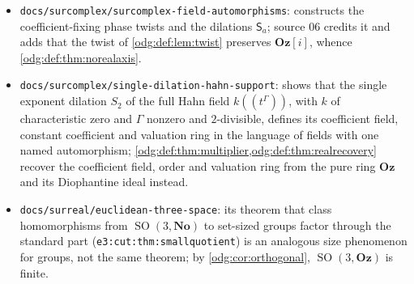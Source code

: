 \documentclass[11pt,oneside]{article}
\numberwithin{equation}{section}
\theoremstyle{definition}
\theoremstyle{remark}
\newcommand{\No}{\mathbf{No}}
\newcommand{\Oz}{\mathbf{Oz}}
\newcommand{\Z}{\mathbb Z}
\newcommand{\GL}{\operatorname{GL}}
\newcommand{\SO}{\operatorname{SO}}
\newcommand{\replabel}[1]{\nolinkurl{#1}}
\newcommand{\fn}[1]{\nolinkurl{#1}}
\newcommand{\Og}{\Oz[i]}
\newcommand{\crA}{\mathcal A_\Bbbk(\Gamma)}
\newcommand{\Ga}{\mathbb G_{\mathrm a}}
\begin{document}
\begin{itemize}[leftmargin=*]
That report also cites \cref{odg:thm:nogcd,odg:thm:realray}, and it answers
\cref{odg:q:affine} for closed subgroup schemes of $\GL_N$ over $\Z$ (and over
$\Z[i]$ for $\Og$), not for general affine varieties or curves; its updated remark
\replabel{ogl:alg:rem:affine} now records the smooth classification and the
normalization criterion for geometrically integral singular curves. The
latter is a geometric criterion for nonconstant $\crA$-points, not a complete
arithmetic existence test over $\Oz$: the case of an affine-line
normalization with integer points but no real normalization preimage of
any of them remains open here (\cref{odg:sg:q:real}). Over $\Og$, an ordinary
Gaussian point and an affine-line normalization do suffice
(\cref{odg:sg:cor:gaussian}). The two answers agree where
they overlap (\cref{odg:cr:rem:ogl}): $\Ga$ is nonrigid and the one-dimensional tori
are rigid; the vector-group kernel of \cref{odg:cr:thm:groupkernel} is its unipotent
kernel \replabel{ogl:alg:prop:bch} for commutative groups; semiabelian rigidity
extends its torus freezing. For a smooth geometrically integral real affine
curve, being the affine line is equivalent to its complexification being
the affine line. Thus rigidity over the real and complex support rings
coincides; arithmetic existence still requires the relevant ordinary
point. Such geometric rigidity does not coincide for all groups ($\SO_3$).
 concerns homomorphisms into class-sized Hahn rings as
well and is consistent with the quotient theorem there.
\item \fn{docs/surcomplex/surcomplex-field-automorphisms}: constructs the
coefficient-fixing phase twists and the dilations $\mathsf S_a$; source 06
credits it and adds that the twist of \cref{odg:def:lem:twist} preserves $\Og$,
whence \cref{odg:def:thm:norealaxis}.
\item \fn{docs/surcomplex/single-dilation-hahn-support}: shows that the single
exponent dilation $S_2$ of the full Hahn field $k((t^\Gamma))$, with
$k$ of characteristic zero and $\Gamma$ nonzero and $2$-divisible, defines
its coefficient field, constant coefficient and valuation ring in the
language of fields with one named automorphism; \cref{odg:def:thm:multiplier,odg:def:thm:realrecovery} recover the
coefficient field, order and valuation ring from the pure ring $\Oz$ and its
Diophantine ideal instead.
\item \fn{docs/surreal/euclidean-three-space}: its theorem that class
homomorphisms from $\SO(3,\No)$ to set-sized groups factor through the
standard part (\replabel{e3:cut:thm:smallquotient}) is an analogous size
phenomenon for groups, not the same theorem; by \cref{odg:cor:orthogonal},
$\SO(3,\Oz)$ is finite.
\end{itemize}
\end{document}
